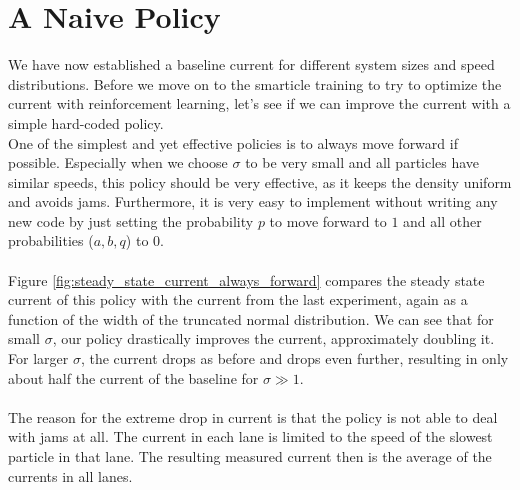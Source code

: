 \section{A Naive Policy}
We have now established a baseline current for different system sizes and speed distributions. Before we move on to the smarticle training to try to optimize the current with reinforcement learning, let's see if we can improve the current with a simple hard-coded policy. 
\\
One of the simplest and yet effective policies is to always move forward if possible. Especially when we choose $\sigma$ to be very small and all particles have similar speeds, this policy should be very effective, as it keeps the density uniform and avoids jams. Furthermore, it is very easy to implement without writing any new code by just setting the probability $p$ to move forward to $1$ and all other probabilities ($a,b,q$) to $0$.
\\
\\
Figure \ref{fig:steady_state_current_always_forward} compares the steady state current of this policy with the current from the last experiment, again as a function of the width of the truncated normal distribution. We can see that for small $\sigma$, our policy drastically improves the current, approximately doubling it. For larger $\sigma$, the current drops as before and drops even further, resulting in only about half the current of the baseline for $\sigma\gg 1$. 
\\
\\
The reason for the extreme drop in current is that the policy is not able to deal with jams at all. The current in each lane is limited to the speed of the slowest particle in that lane. The resulting measured current then is the average of the currents in all lanes. 
\\
